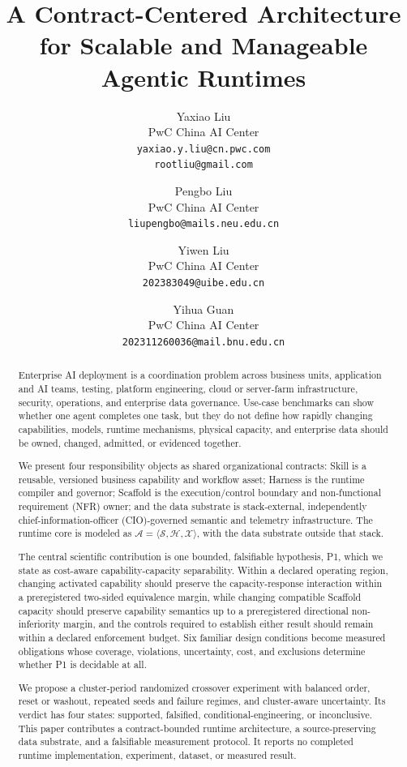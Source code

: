 \documentclass[11pt]{article}
\title{A Contract-Centered Architecture for Scalable and Manageable Agentic Runtimes}
\author{%
Yaxiao Liu\\
PwC China AI Center\\
\texttt{yaxiao.y.liu@cn.pwc.com}\\
\texttt{rootliu@gmail.com}
\and
Pengbo Liu\\
PwC China AI Center\\
\texttt{liupengbo@mails.neu.edu.cn}
\and
Yiwen Liu\\
PwC China AI Center\\
\texttt{202383049@uibe.edu.cn}
\and
Yihua Guan\\
PwC China AI Center\\
\texttt{202311260036@mail.bnu.edu.cn}
}
\date{}
\begin{document}
\maketitle


\begin{abstract}
Enterprise AI deployment is a coordination problem across business units, application and AI teams, testing, platform engineering, cloud or server-farm infrastructure, security, operations, and enterprise data governance. Use-case benchmarks can show whether one agent completes one task, but they do not define how rapidly changing capabilities, models, runtime mechanisms, physical capacity, and enterprise data should be owned, changed, admitted, or evidenced together.

We present four responsibility objects as shared organizational contracts: Skill is a reusable, versioned business capability and workflow asset; Harness is the runtime compiler and governor; Scaffold is the execution/control boundary and non-functional requirement (NFR) owner; and the data substrate is stack-external, independently chief-information-officer (CIO)-governed semantic and telemetry infrastructure. The runtime core is modeled as $\mathcal{A}=\langle\mathcal{S},\mathcal{H},\mathcal{X}\rangle$, with the data substrate outside that stack.

The central scientific contribution is one bounded, falsifiable hypothesis, P1, which we state as cost-aware capability-capacity separability. Within a declared operating region, changing activated capability should preserve the capacity-response interaction within a preregistered two-sided equivalence margin, while changing compatible Scaffold capacity should preserve capability semantics up to a preregistered directional non-inferiority margin, and the controls required to establish either result should remain within a declared enforcement budget. Six familiar design conditions become measured obligations whose coverage, violations, uncertainty, cost, and exclusions determine whether P1 is decidable at all.

We propose a cluster-period randomized crossover experiment with balanced order, reset or washout, repeated seeds and failure regimes, and cluster-aware uncertainty. Its verdict has four states: supported, falsified, conditional-engineering, or inconclusive. This paper contributes a contract-bounded runtime architecture, a source-preserving data substrate, and a falsifiable measurement protocol. It reports no completed runtime implementation, experiment, dataset, or measured result.
\end{abstract}
\end{document}
